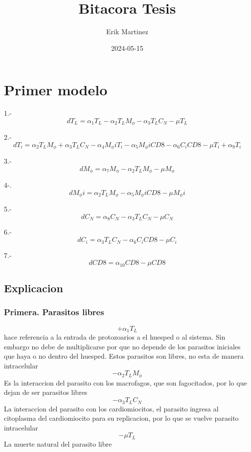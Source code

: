 \documentclass[
]{article}
\title{Bitacora Tesis}
\author{Erik Martinez}
\date{2024-05-15}
\begin{document}
\maketitle

\hypertarget{primer-modelo}{%
\section{Primer modelo}\label{primer-modelo}}

1.-\[ d{T_{L}} = \alpha_{1} T_{L} - \alpha_{2} T_{L}M_{\phi} - \alpha_{3}T_{L}C_{N} - \mu T_{L} \]

2.-\[ dT_{i} = \alpha_{2}T_{L}M_{\phi} + \alpha_{3}T_{L}C_{N} - \alpha_{4}M_{\phi}iT_{i}-\alpha_{5}M_{\phi}iCD8 - \alpha_{6}C_{i}CD8 - \mu T_{i} + \alpha_{9}T_{i} \]

3.-\[ dM_{\phi} = \alpha_{7}M_{\phi} - \alpha_{2}T_{L}M_{\phi} - \mu M_{\phi} \]

4-.\[ dM_{\phi}i = \alpha_{2}T_{L}M_{\phi} - \alpha_{5}M_{\phi}iCD8 -\mu M_{\phi}i \]

5.-\[ dC_{N}= \alpha_{8}C_{N} - \alpha_{3}T_{L}C_{N} - \mu C_{N} \]

6.-\[ dC_{i} = \alpha_{3}T_{L}C_{N} - \alpha_{6}C_{i}CD8 - \mu C_{i} \]

7.- \[ dCD8 = \alpha_{10} CD8 - \mu CD8 \]

\hypertarget{explicacion}{%
\subsection{Explicacion}\label{explicacion}}

\hypertarget{primera.-parasitos-libres}{%
\subsubsection{Primera. Parasitos
libres}\label{primera.-parasitos-libres}}

\[ +\alpha_{1} T_{L}  \] hace referencia a la entrada de protozoarios a
el huesped o al sistema. Sin embargo no debe de multiplicarse por que no
depende de los parasitos iniciales que haya o no dentro del huesped.
Estos parasitos son libres, no esta de manera intracelular
\[ -\alpha_{2} T_{L}M_{\phi} \] Es la interaccion del parasito con los
macrofagos, que son fagocitados, por lo que dejan de ser parasitos
libres \[ -\alpha_{3}T_{L}C_{N} \] La interaccion del parasito con los
cardiomiocitos, el parasito ingresa al citoplasma del cardiomiocito para
su replicacion, por lo que se vuelve parasito intracelular
\[-\mu T_{L}\] La muerte natural del parasito libre
\end{document}
